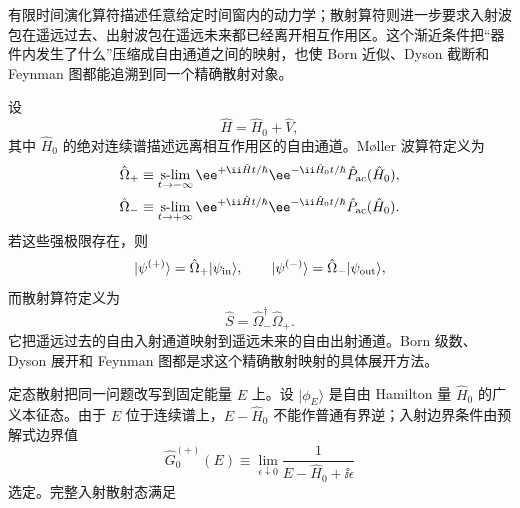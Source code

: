 

有限时间演化算符描述任意给定时间窗内的动力学；散射算符则进一步要求入射波包在遥远过去、出射波包在遥远未来都已经离开相互作用区。这个渐近条件把“器件内发生了什么”压缩成自由通道之间的映射，也使 Born 近似、Dyson 截断和 Feynman 图都能追溯到同一个精确散射对象。

设
\begin{equation}
 \hat H=\hat H_0+\hat V,
 \label{eq:H-scattering-r5}
\end{equation}
其中 $\hat H_0$ 的绝对连续谱描述远离相互作用区的自由通道。M{\o}ller 波算符定义为
\begin{align}
 \hat\Omega_+
 &\equiv
 \operatorname*{s-lim}_{t\to-\infty}
 \ee^{+\ii\hat Ht/\hbar}
 \ee^{-\ii\hat H_0t/\hbar}
 \hat P_{\rm ac}(\hat H_0),\\
 \hat\Omega_-
 &\equiv
 \operatorname*{s-lim}_{t\to+\infty}
 \ee^{+\ii\hat Ht/\hbar}
 \ee^{-\ii\hat H_0t/\hbar}
 \hat P_{\rm ac}(\hat H_0).
 \label{eq:moller-wave-operators-r5}
\end{align}
若这些强极限存在，则
\begin{equation*}
 |\psi^{(+)}\rangle=\hat\Omega_+|\psi_{\rm in}\rangle,
 \qquad
 |\psi^{(-)}\rangle=\hat\Omega_-|\psi_{\rm out}\rangle,
\end{equation*}
而散射算符定义为
\begin{equation}
 {\hat S=\hat\Omega_-^\dagger\hat\Omega_+.}
 \label{eq:exact-S-waveop-r5}
\end{equation}
它把遥远过去的自由入射通道映射到遥远未来的自由出射通道。Born 级数、Dyson 展开和 Feynman 图都是求这个精确散射映射的具体展开方法。

定态散射把同一问题改写到固定能量 $E$ 上。设 $|\phi_E\rangle$ 是自由 Hamilton 量 $\hat H_0$ 的广义本征态。由于 $E$ 位于连续谱上，$E-\hat H_0$ 不能作普通有界逆；入射边界条件由预解式边界值
\begin{equation}
 \hat G_0^{(+)}(E)
 \equiv\lim_{\epsilon\downarrow0}
 \frac{1}{E-\hat H_0+\ii\epsilon}
 \label{eq:G0-plus-r5}
\end{equation}
选定。完整入射散射态满足


